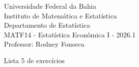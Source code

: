 \documentclass{article}
\date{--/--/----} %
\begin{document}
\begin{flushleft}
	Universidade Federal da Bahia\\
	Instituto de Matemática e Estatística\\
	Departamento de Estatística\\
	MATF14 - Estatística Econômica I - 2026.1\\
	Professor: Rodney Fonseca \\
\end{flushleft}

\begin{center}
	\begin{Large}
		Lista 5 de exercícios \\
	\end{Large}	
\end{center}





\vspace{2em}
\end{document}
